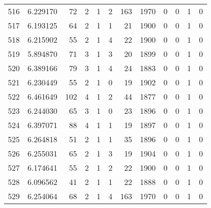 \begin{tabular}{lrrrrrrrrrrr}
516 &  6.229170 &   72 &      2 &        1 &      2 &             163 &  1970 &               0 &               0 &               1 &               0 \\
517 &  6.193125 &   64 &      2 &        1 &      1 &              21 &  1900 &               0 &               0 &               1 &               0 \\
518 &  6.215902 &   55 &      2 &        1 &      4 &              22 &  1900 &               0 &               0 &               1 &               0 \\
519 &  5.894870 &   71 &      3 &        1 &      3 &              20 &  1899 &               0 &               0 &               1 &               0 \\
520 &  6.389166 &   79 &      3 &        1 &      4 &              24 &  1883 &               0 &               0 &               1 &               0 \\
521 &  6.230449 &   55 &      2 &        1 &      0 &              19 &  1902 &               0 &               0 &               1 &               0 \\
522 &  6.461649 &  102 &      4 &        1 &      2 &              44 &  1877 &               0 &               0 &               1 &               0 \\
523 &  6.244030 &   65 &      3 &        1 &      0 &              23 &  1896 &               0 &               0 &               1 &               0 \\
524 &  6.397071 &   88 &      4 &        1 &      1 &              19 &  1897 &               0 &               0 &               1 &               0 \\
525 &  6.264818 &   51 &      2 &        1 &      1 &              35 &  1896 &               0 &               0 &               1 &               0 \\
526 &  6.255031 &   65 &      2 &        1 &      3 &              19 &  1904 &               0 &               0 &               1 &               0 \\
527 &  6.174641 &   55 &      2 &        1 &      2 &              22 &  1900 &               0 &               0 &               1 &               0 \\
528 &  6.096562 &   41 &      2 &        1 &      1 &              22 &  1888 &               0 &               0 &               1 &               0 \\
529 &  6.254064 &   68 &      2 &        1 &      4 &             163 &  1970 &               0 &               0 &               1 &               0 \\

\end{tabular}
